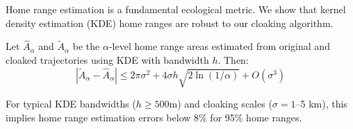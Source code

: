 Home range estimation is a fundamental ecological metric. We show that kernel density estimation (KDE) home ranges are robust to our cloaking algorithm.

\begin{proposition}
Let $\hat{A}_\alpha$ and $\tilde{A}_\alpha$ be the $\alpha$-level home range areas estimated from original and cloaked trajectories using KDE with bandwidth $h$. Then:
\begin{equation}
|\tilde{A}_\alpha - \hat{A}_\alpha| \leq 2\pi \sigma^2 + 4\sigma h \sqrt{2\ln(1/\alpha)} + O(\sigma^3)
\end{equation}
\end{proposition}

For typical KDE bandwidths ($h \geq 500$m) and cloaking scales ($\sigma = 1$--5 km), this implies home range estimation errors below 8\% for 95\% home ranges.

